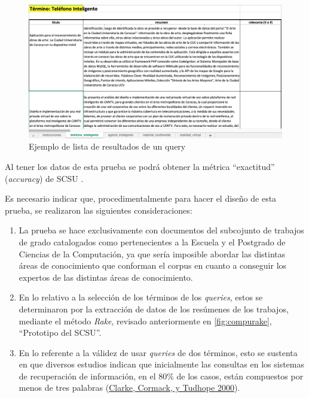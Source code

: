 \documentclass[
  12pt,
  openany]{book}
\begin{document}
\begin{figure}

{\centering \includegraphics[width=0.95\linewidth]{images/05-desarrollo/prueba/pruebaquery} 

}

\caption{Ejemplo de lista de resultados de un query}\label{fig:pruebaquery}
\end{figure}

Al tener los datos de esta prueba se podrá obtener la métrica ``exactitud'' (\emph{accuracy}) de SCSU .

Es necesario indicar que, procedimentalmente para hacer el diseño de esta prueba, se realizaron las siguientes consideraciones:

\begin{enumerate}
\def\labelenumi{\arabic{enumi}.}
\item
  La prueba se hace exclusivamente con documentos del subcojunto de trabajos de grado catalogados como pertenecientes a la Escuela y el Postgrado de Ciencias de la Computación, ya que sería imposible abordar las distintas áreas de conocimiento que conforman el corpus en cuanto a conseguir los expertos de las distintas áreas de conocimiento.
\item
  En lo relativo a la selección de los términos de los \emph{queries}, estos se determinaron por la extracción de datos de los resúmenes de los trabajos, mediante el método \emph{Rake}, revisado anteriormente en \ref{fig:compurake}, ``Prototipo del SCSU''.
\item
  En lo referente a la válidez de usar \emph{queries} de dos términos, esto se sustenta en que diversos estudios indican que inicialmente las consultas en los sistemas de recuperación de información, en el 80\% de los casos, están compuestos por menos de tres palabras (\protect\hyperlink{ref-clarke2000}{Clarke, Cormack, y Tudhope 2000}).
\end{enumerate}
\end{document}

